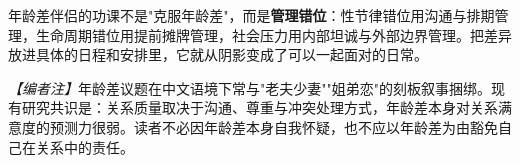 \begin{tcolorbox}[colback=pink!5!white,colframe=red!50!black,title=核心原则]
年龄差伴侣的功课不是"克服年龄差"，而是\textbf{管理错位}：性节律错位用沟通与排期管理，生命周期错位用提前摊牌管理，社会压力用内部坦诚与外部边界管理。把差异放进具体的日程和安排里，它就从阴影变成了可以一起面对的日常。
\end{tcolorbox}

\noindent\textit{【编者注】}年龄差议题在中文语境下常与"老夫少妻""姐弟恋"的刻板叙事捆绑。现有研究共识是：关系质量取决于沟通、尊重与冲突处理方式，年龄差本身对关系满意度的预测力很弱。读者不必因年龄差本身自我怀疑，也不应以年龄差为由豁免自己在关系中的责任。
